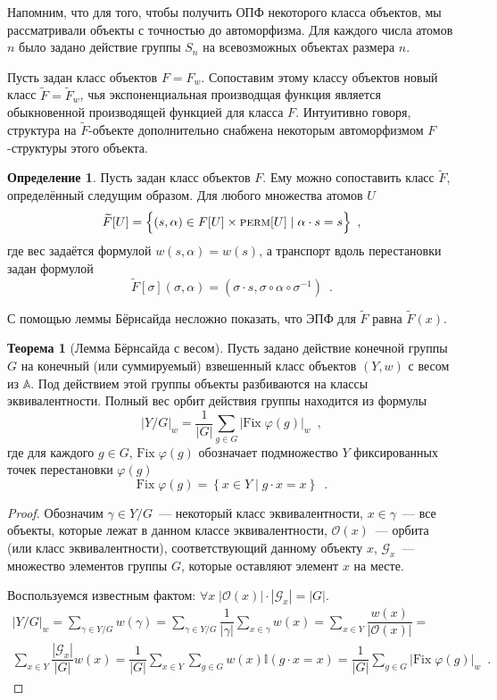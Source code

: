\documentclass[a5paper]{article}
\theoremstyle{definition}
\newtheorem*{theorem}{Теорема}
\newtheorem*{definition}{Определение}
\begin{document}
Напомним, что для того, чтобы получить ОПФ
некоторого класса объектов, мы рассматривали объекты с точностью до
автоморфизма. Для каждого числа атомов \( n \) было задано действие группы \(
S_n \) на всевозможных объектах размера \( n
\).

Пусть задан класс объектов \( F = F_w \). Сопоставим этому классу объектов новый класс
\( \widetilde F = \widetilde F_w \), чья экспоненциальная производщая функция является
обыкновенной производящей функцией для класса \( F \). Интуитивно говоря, структура
на \( \widetilde F \)-объекте дополнительно снабжена некоторым автоморфизмом \( F
\)-структуры этого объекта.
\begin{definition}
    Пусть задан класс объектов \( F \). Ему можно сопоставить класс \( \widetilde
F \), определённый следущим образом. Для любого множества атомов \( U \)
\[
    \widetilde F[U] = \Big\{
        (s, \alpha) \in F[U] \times \text{\textsc{perm}}[U] \mid
         \alpha \cdot s = s
    \Big\} \enspace ,
\]
где вес задаётся формулой \(w(s, \alpha) = w(s) \), а  транспорт вдоль перестановки задан формулой
\[
    \widetilde F[\sigma](\sigma, \alpha) = (\sigma \cdot s, \sigma \circ \alpha
\circ \sigma^{-1} ) \enspace .
\]
\end{definition}
С помощью леммы Бёрнсайда несложно показать, что ЭПФ для \( \widetilde F  \)
равна \( \widetilde F(x) \).
\begin{theorem}[Лемма Бёрнсайда с весом]
    Пусть задано действие конечной группы \( G \) на конечный (или суммируемый)
взвешенный класс объектов \( (Y, w) \) с весом из \( \mathbb A \). Под действием
этой группы объекты разбиваются на классы эквивалентности. Полный вес орбит
действия группы находится из формулы
\[
    |Y / G|_w = \dfrac{1}{|G|} \sum_{g \in G} |\mathrm{Fix}\; \varphi(g) |_w
\enspace ,
\]
где для каждого \( g \in G \), \( \mathrm{Fix} \; \varphi(g) \) обозначает
подмножество \( Y \) фиксированных точек перестановки \( \varphi(g) \)
\[
    \mathrm{Fix}\; \varphi(g) = \left\{
        x \in Y \mid g \cdot x = x
    \right\}
    \enspace .
\]
\end{theorem}
\begin{proof}
Обозначим \( \gamma \in Y / G \)~--- некоторый класс эквивалентности, \( x \in
\gamma \)~--- все объекты, которые лежат в данном классе эквивалентности, \(
\mathcal O(x) \)~--- орбита (или класс эквивалентности), соответствующий данному
объекту \( x \), \( \mathcal G_x \)~--- множество элементов группы \( G \),
которые оставляют элемент \( x \) на месте.

Воспользуемся известным фактом: \( \forall x \; |\mathcal O(x) | \cdot |\mathcal
G_x| = |G| \).
    \begin{multline*}
    |Y / G|_w = \sum_{\gamma \in Y / G} w(\gamma) = 
    \sum_{\gamma \in Y / G} \dfrac{1}{|\gamma|} \sum_{x \in \gamma} w(x)
    = \sum_{x \in Y} \dfrac{w(x)}{|\mathcal O(x)|}= 
    \\
    \sum_{x \in Y} \dfrac{|\mathcal G_x|}{|G|} w(x) 
    =
    \dfrac{1}{|G|} \sum_{x \in Y} \sum_{g \in G} w(x) \mathbb I(g \cdot x = x)
    =
    \dfrac{1}{|G|} \sum_{g \in G} |\mathrm{Fix} \; \varphi(g)|_w \enspace .
    \end{multline*}
\end{proof}
\end{document}

